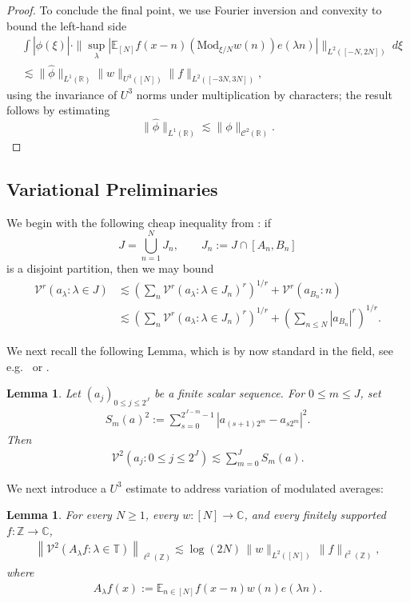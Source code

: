 \documentclass[12pt]{amsart}
\numberwithin{equation}{section}
\newtheorem{lemma}[theorem]{Lemma}
\theoremstyle{definition}
\begin{document}
\begin{proof}
To conclude the final point, we use Fourier inversion and convexity to bound the left-hand side
\begin{align}
&\int |\widehat{\phi}(\xi)| \cdot \| \sup_\lambda |\mathbb{E}_{[N]} f(x-n) (\text{Mod}_{\xi/N} w(n)) e(\lambda n)| \|_{L^2([-N,2N])} \ d\xi \\
& \lesssim \| \widehat{\phi} \|_{L^1(\mathbb{R})} \| w \|_{U^3([N])} \|f \|_{L^2([-3N,3N])},
\end{align}
using the invariance of $U^3$ norms under multiplication by characters; the result follows by estimating 
\[ \| \widehat{\phi} \|_{L^1(\mathbb{R})} \lesssim \|\phi \|_{\mathcal{C}^2(\mathbb{R})}.\]
\end{proof}



\subsection{Variational Preliminaries}
We begin with the following cheap inequality from \cite{JSW}: if
\[ J = \bigcup_{n=1}^N J_n, \qquad J_n := J \cap [A_n,B_n] \]
is a disjoint partition, then we may bound
\begin{align}\label{e:split}
\mathcal{V}^r(a_\lambda : \lambda \in J) &\lesssim (\sum_n \mathcal{V}^r(a_\lambda : \lambda \in J_n)^r)^{1/r} + \mathcal{V}^r(a_{B_n} : n) \\
& \lesssim (\sum_n \mathcal{V}^r(a_\lambda : \lambda \in J_n)^r)^{1/r} + (\sum_{n \leq N} |a_{B_n}|^r)^{1/r}.
\end{align}

We next recall the following Lemma, which is by now standard in the field, see e.g.\ \cite{LL} or \cite[\S 4]{BOOK}.
\begin{lemma}\label{l:RMvariation}
Let \((a_j)_{0\leq j\leq 2^J}\) be a finite scalar sequence.  For
\(0\leq m\leq J\), set
\begin{align}
    S_m(a)^2
    :=
    \sum_{s=0}^{2^{J-m}-1}
    |a_{(s+1)2^m}-a_{s2^m}|^2.
\end{align}
Then
\begin{align}
    \mathcal V^2(a_j:0\leq j\leq 2^J)
    \lesssim
    \sum_{m=0}^J S_m(a).
\end{align}
\end{lemma}

We next introduce a $U^3$ estimate to address variation of modulated averages:

\begin{lemma}\label{l:crudeV2lambda}
For every \(N\geq1\), every \(w:[N]\to\mathbb C\), and every finitely supported
\(f:\mathbb Z\to\mathbb C\),
\begin{align}
    \left\|
    \mathcal V^2(A_\lambda f : \lambda \in \mathbb{T})
    \right\|_{\ell^2(\mathbb Z)}
    \lesssim
    \log(2N)\,\|w\|_{L^2([N])}\,\|f\|_{\ell^2(\mathbb Z)},
\end{align}
where
\begin{align}
    A_\lambda f(x)
    :=
    \mathbb E_{n\in[N]} f(x-n)w(n)e(\lambda n).
\end{align}
\end{lemma}
\end{document}

